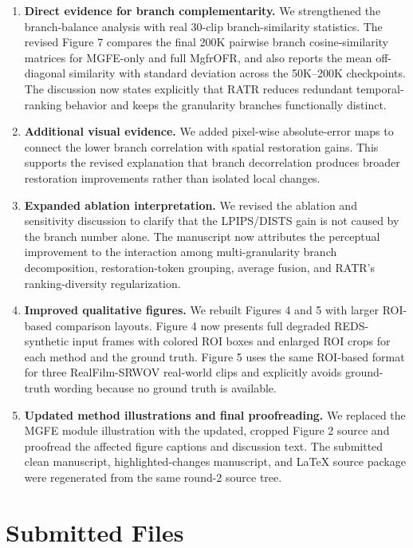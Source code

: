 \documentclass[11pt]{article}
\begin{document}
\begin{enumerate}
\item \textbf{Direct evidence for branch complementarity.} We strengthened the branch-balance analysis with real 30-clip branch-similarity statistics. The revised Figure 7 compares the final 200K pairwise branch cosine-similarity matrices for MGFE-only and full MgfrOFR, and also reports the mean off-diagonal similarity with standard deviation across the 50K--200K checkpoints. The discussion now states explicitly that RATR reduces redundant temporal-ranking behavior and keeps the granularity branches functionally distinct.

\item \textbf{Additional visual evidence.} We added pixel-wise absolute-error maps to connect the lower branch correlation with spatial restoration gains. This supports the revised explanation that branch decorrelation produces broader restoration improvements rather than isolated local changes.

\item \textbf{Expanded ablation interpretation.} We revised the ablation and sensitivity discussion to clarify that the LPIPS/DISTS gain is not caused by the branch number alone. The manuscript now attributes the perceptual improvement to the interaction among multi-granularity branch decomposition, restoration-token grouping, average fusion, and RATR's ranking-diversity regularization.

\item \textbf{Improved qualitative figures.} We rebuilt Figures 4 and 5 with larger ROI-based comparison layouts. Figure 4 now presents full degraded REDS-synthetic input frames with colored ROI boxes and enlarged ROI crops for each method and the ground truth. Figure 5 uses the same ROI-based format for three RealFilm-SRWOV real-world clips and explicitly avoids ground-truth wording because no ground truth is available.

\item \textbf{Updated method illustrations and final proofreading.} We replaced the MGFE module illustration with the updated, cropped Figure 2 source and proofread the affected figure captions and discussion text. The submitted clean manuscript, highlighted-changes manuscript, and LaTeX source package were regenerated from the same round-2 source tree.
\end{enumerate}

\section*{Submitted Files}
\end{document}
